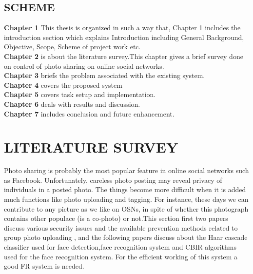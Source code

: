 \section[Scheme]{\fontsize{14}{12}\selectfont SCHEME}
\textbf{Chapter 1} This thesis is organized in such a way that, Chapter 1 includes the introduction section which explains Introduction including General Background, Objective, Scope, Scheme of project work etc.\\
\textbf{Chapter 2} is about the literature survey.This chapter gives a brief survey done on control of photo sharing on online social networks.\\
\textbf{Chapter 3} briefs the problem associated with the existing system.\\
\textbf{Chapter 4} covers the proposed system \\
\textbf{Chapter 5} covers task setup and implementation.\\
\textbf{Chapter 6} deals with results and discussion.\\
\textbf{Chapter 7} includes conclusion and future enhancement.\\
\chapter[LITERATURE SURVEY]{\fontsize{16}{12}\selectfont LITERATURE SURVEY}
Photo sharing is probably the most popular feature in online social networks such as Facebook. Unfortunately, careless photo posting may reveal privacy of individuals in a posted photo. The things become more difficult when it is added much functions like photo uploading and tagging. For instance, these days we can contribute to any picture as we like on OSNs, in spite of whether this photograph contains other populace (is a co-photo) or not.This section first two papers discuss various security issues and the available prevention methods  related to group photo uploading , and the following  papers  discuss about the Haar cascade classifier used for face detection,face recognition system and  CBIR algorithms  used for the face recognition system. For  the efficient  working of this system a good FR system is needed. 
